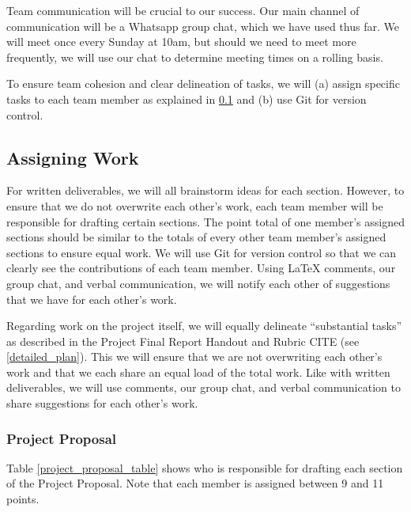 \documentclass{article} %
\begin{document}
Team communication will be crucial to our success. Our main channel of communication will be a Whatsapp group chat, which we have used thus far. We will meet once every Sunday at 10am, but should we need to meet more frequently, we will use our chat to determine meeting times on a rolling basis.

To ensure team cohesion and clear delineation of tasks, we will (a) assign specific tasks to each team member as explained in \ref{assigning_work} and (b) use Git for version control.

\subsection{Assigning Work}
\label{assigning_work}

For written deliverables, we will all brainstorm ideas for each section. However, to ensure that we do not overwrite each other's work, each team member will be responsible for drafting certain sections. The point total of one member's assigned sections should be similar to the totals of every other team member's assigned sections to ensure equal work. We will use Git for version control so that we can clearly see the contributions of each team member. Using LaTeX comments, our group chat, and verbal communication, we will notify each other of suggestions that we have for each other's work.

Regarding work on the project itself, we will equally delineate ``substantial tasks'' as described in the Project Final Report Handout and Rubric CITE (see \ref{detailed_plan}). This we will ensure that we are not overwriting each other's work and that we each share an equal load of the total work. Like with written deliverables, we will use comments, our group chat, and verbal communication to share suggestions for each other's work.

\subsubsection{Project Proposal}

Table \ref{project_proposal_table} shows who is responsible for drafting each section of the Project Proposal. Note that each member is assigned between 9 and 11 points.
\end{document}
